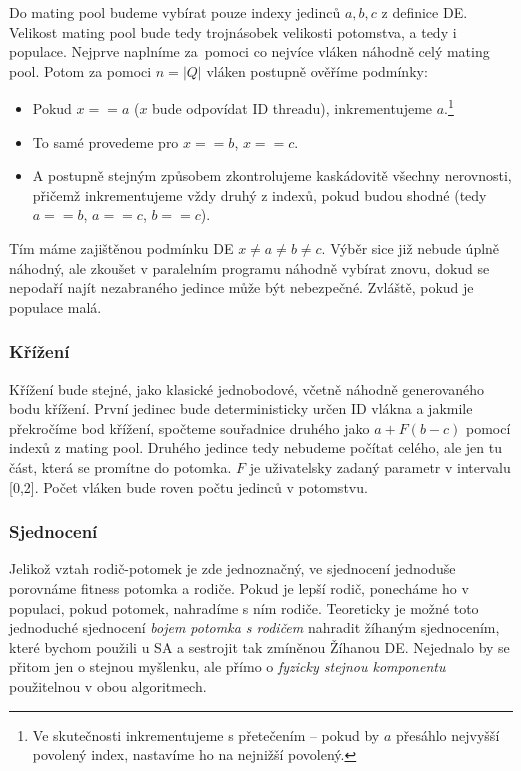 Do mating pool budeme vybírat pouze indexy jedinců $a,b,c$ z definice DE. Velikost mating pool bude tedy trojnásobek velikosti potomstva, a tedy i populace. Nejprve naplníme za~pomoci co nejvíce vláken náhodně celý mating pool. Potom za pomoci $n = |Q|$ vláken postupně ověříme podmínky:
\begin{itemize}
  \item Pokud $x == a$ ($x$ bude odpovídat ID threadu), inkrementujeme $a$.\footnote{Ve skutečnosti inkrementujeme s přetečením -- pokud by $a$ přesáhlo nejvyšší povolený index, nastavíme ho na nejnižší povolený.}
  \item To samé provedeme pro $x == b$, $x == c$.
  \item A postupně stejným způsobem zkontrolujeme kaskádovitě všechny nerovnosti, přičemž inkrementujeme vždy druhý z indexů, pokud budou shodné (tedy $a == b$, $a == c$, $b == c$).
\end{itemize}
Tím máme zajištěnou podmínku DE $x\neq a\neq b\neq c$. Výběr sice již nebude úplně náhodný, ale zkoušet v paralelním programu náhodně vybírat znovu, dokud se nepodaří najít nezabraného jedince může být nebezpečné. Zvláště, pokud je populace malá.

\subsubsection{Křížení}

Křížení bude stejné, jako klasické jednobodové, včetně náhodně generovaného bodu křížení. První jedinec bude deterministicky určen ID vlákna a jakmile překročíme bod křížení, spočteme souřadnice druhého jako $a + F(b-c)$ pomocí indexů z mating pool. Druhého jedince tedy nebudeme počítat celého, ale jen tu část, která se promítne do potomka. $F$ je uživatelsky zadaný parametr v intervalu [0,2]. Počet vláken bude roven počtu jedinců v potomstvu.

\subsubsection{Sjednocení}

Jelikož vztah rodič-potomek je zde jednoznačný, ve sjednocení jednoduše porovnáme fitness potomka a rodiče. Pokud je lepší rodič, ponecháme ho v populaci, pokud potomek, nahradíme s ním rodiče. Teoreticky je možné toto jednoduché sjednocení \emph{bojem potomka s rodičem} nahradit žíhaným sjednocením, které bychom použili u SA a sestrojit tak zmíněnou Žíhanou DE. Nejednalo by se přitom jen o stejnou myšlenku, ale přímo o \emph{fyzicky stejnou komponentu} použitelnou v obou algoritmech.

